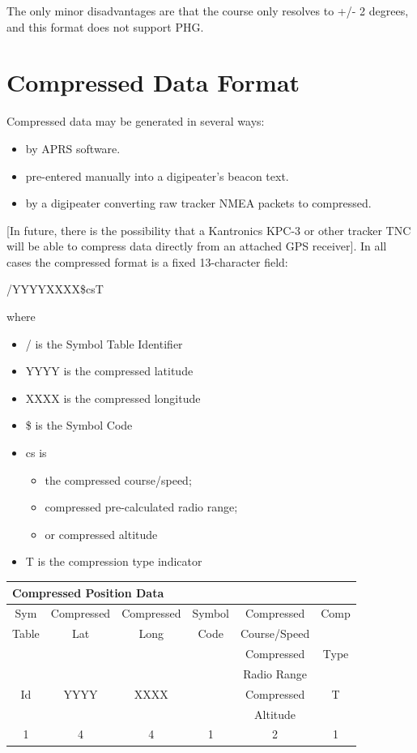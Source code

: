 The only minor disadvantages are that the course only resolves to +/- 2
degrees, and this format does not support PHG.


\section {Compressed Data Format}

Compressed data may be generated in several ways:

\begin{itemize}
 \item by APRS software.
\item pre-entered manually into a digipeater’s beacon text.
\item by a digipeater converting raw tracker NMEA packets to compressed.
\end{itemize}


[In future, there is the possibility that a Kantronics KPC-3 or other tracker
TNC will be able to compress data directly from an attached GPS receiver].
In all cases the compressed format is a fixed 13-character field:

/YYYYXXXX\$csT

where

\begin{itemize}

\item / is the Symbol Table Identifier
\item YYYY is the compressed latitude
\item XXXX is the compressed longitude
\item \$ is the Symbol Code
\item cs is
  \begin {itemize}
  \item  the compressed course/speed;
  \item compressed pre-calculated radio range;
  \item or compressed altitude
    \end {itemize}
\item T is the compression type indicator

\end {itemize}

\begin{tabular}{|c|c|c|c|c|c|}
  \hline
  \multicolumn {6}{|l|}{Compressed Position Data} \\
  \hline
  Sym & Compressed & Compressed & Symbol & Compressed   & Comp \\ [-1ex]
  Table    & Lat  & Long  & Code  & Course/Speed &  \\ 
  \hline 
   &  &  &  & Compressed  & Type \\  [-1ex]
  
   &  &  &  & Radio Range &  \\ 
  \hline 
  Id & YYYY & XXXX &  & Compressed  & T \\ [-1ex]

      &  &  &  & Altitude &  \\
  \hline 
  1 & 4 & 4 & 1 & 2 & 1 \\
  \hline 
\end{tabular}



